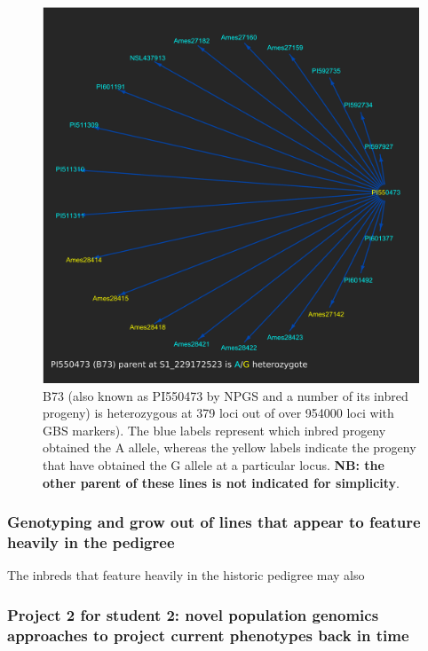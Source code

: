 \documentclass[12pt]{article}
\begin{document}
\begin{figure}[p]
\includegraphics[width=1.0\linewidth]{Pruned.pdf}
\caption{B73 (also known as PI550473 by NPGS and a number of its inbred progeny) is heterozygous at 379 loci out of over 954000 loci with GBS markers). The blue labels represent which inbred progeny obtained the A allele, whereas the yellow labels indicate the progeny that have obtained the G allele at a particular locus. \textbf{NB: the other parent of these lines is not indicated for simplicity}.}
\label{fig:alleledrop}
\end{figure}


\subsubsection*{Genotyping and grow out of lines that appear to feature heavily in the pedigree}
The inbreds that feature heavily in the historic pedigree may also  



\subsubsection*{Project 2 for student 2: novel population genomics approaches to project current phenotypes back in time}
\end{document}
